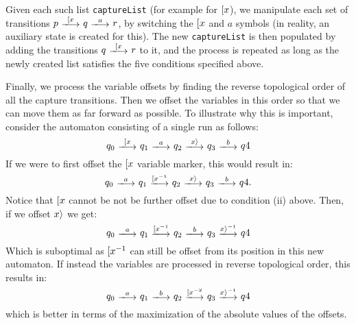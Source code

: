 Given each such list \texttt{captureList} (for example for $[ x$), we
manipulate each set of transitions $p\ \longtrans{\Open{x}}\ q\ \longtrans{a}\
r$, by switching the $[ x$ and $a$ symbols (in reality, an auxiliary state
is created for this). The new \texttt{captureList} is then populated by adding
the transitions $q\ \longtrans{\Open{x}}\ r$ to it, and the process is repeated
as long as the newly created list satisfies the five conditions specified above.

Finally, we process the variable offsets by finding the reverse topological
order of all the capture transitions. Then we offset the variables in this order
so that we can move them as far forward as possible. To illustrate why this is
important, consider the automaton consisting of a single run as follows:
$$q_0\ \longtrans{\Open{x}}\ q_1\ \longtrans{a}\ q_2\ \longtrans{\Close{x}}\
q_3\ \longtrans{b}\ q4$$ If we were to first offset the $[ x$ variable
marker, this would result in:
$$q_0\ \longtrans{a}\ q_1\ \longtrans{\Open{x}^{-1}}\ q_2\
\longtrans{\Close{x}}\ q_3\ \longtrans{b}\ q4.$$ Notice that $[ x$ cannot
be not be further offset due to condition (ii) above. Then, if we offset
$x \rangle$ we get: $$q_0\ \longtrans{a}\ q_1\ \longtrans{\Open{x}^{-1}}\ q_2\
\longtrans{b}\ q_3\ \longtrans{\Close{x}^{-1}}\ q4$$ Which is suboptimal as
$[ x^{-1}$ can still be offset from its position in this new automaton. If
instead the variables are processed in reverse topological order, this results
in:
$$q_0\ \longtrans{a}\ q_1\ \longtrans{b}\ q_2\ \longtrans{\Open{x}^{-2}}\ q_3\
\longtrans{\Close{x}^{-1}}\ q4$$ which is better in terms of the maximization of
the absolute values of the offsets.

